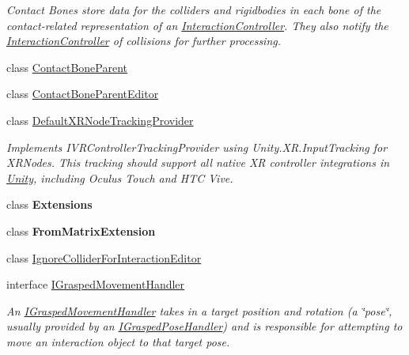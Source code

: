 \begin{DoxyCompactItemize}
\begin{DoxyCompactList}\small\item\em Contact Bones store data for the colliders and rigidbodies in each bone of the contact-\/related representation of an \mbox{\hyperlink{class_leap_1_1_unity_1_1_interaction_1_1_interaction_controller}{Interaction\+Controller}}. They also notify the \mbox{\hyperlink{class_leap_1_1_unity_1_1_interaction_1_1_interaction_controller}{Interaction\+Controller}} of collisions for further processing. \end{DoxyCompactList}\item 
class \mbox{\hyperlink{class_leap_1_1_unity_1_1_interaction_1_1_contact_bone_parent}{Contact\+Bone\+Parent}}
\item 
class \mbox{\hyperlink{class_leap_1_1_unity_1_1_interaction_1_1_contact_bone_parent_editor}{Contact\+Bone\+Parent\+Editor}}
\item 
class \mbox{\hyperlink{class_leap_1_1_unity_1_1_interaction_1_1_default_x_r_node_tracking_provider}{Default\+X\+R\+Node\+Tracking\+Provider}}
\begin{DoxyCompactList}\small\item\em Implements I\+V\+R\+Controller\+Tracking\+Provider using Unity.\+X\+R.\+Input\+Tracking for X\+R\+Nodes. This tracking should support all native XR controller integrations in \mbox{\hyperlink{namespace_leap_1_1_unity}{Unity}}, including Oculus Touch and H\+TC Vive. \end{DoxyCompactList}\item 
class {\bfseries Extensions}
\item 
class {\bfseries From\+Matrix\+Extension}
\item 
class \mbox{\hyperlink{class_leap_1_1_unity_1_1_interaction_1_1_ignore_collider_for_interaction_editor}{Ignore\+Collider\+For\+Interaction\+Editor}}
\item 
interface \mbox{\hyperlink{interface_leap_1_1_unity_1_1_interaction_1_1_i_grasped_movement_handler}{I\+Grasped\+Movement\+Handler}}
\begin{DoxyCompactList}\small\item\em An \mbox{\hyperlink{interface_leap_1_1_unity_1_1_interaction_1_1_i_grasped_movement_handler}{I\+Grasped\+Movement\+Handler}} takes in a target position and rotation (a \char`\"{}pose\char`\"{}, usually provided by an \mbox{\hyperlink{interface_leap_1_1_unity_1_1_interaction_1_1_i_grasped_pose_handler}{I\+Grasped\+Pose\+Handler}}) and is responsible for attempting to move an interaction object to that target pose. \end{DoxyCompactList}\item 

\end{DoxyCompactItemize}
